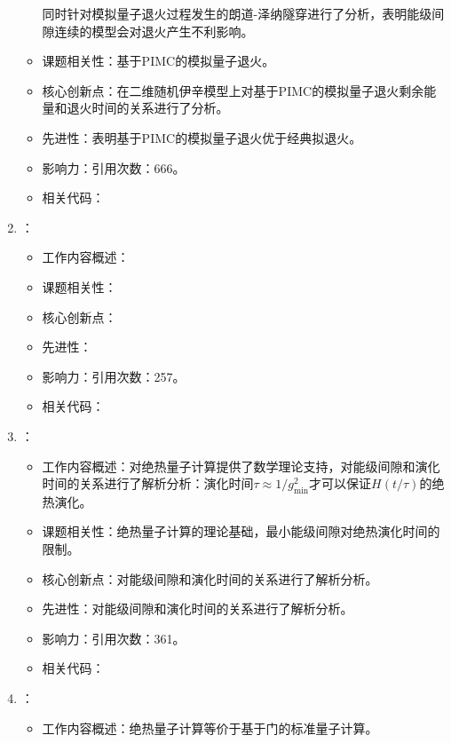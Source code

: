 \begin{enumerate}
\begin{itemize}
                同时针对模拟量子退火过程发生的朗道-泽纳隧穿进行了分析，表明能级间隙连续的模型会对退火产生不利影响。
                \item 课题相关性：基于PIMC的模拟量子退火。
                \item 核心创新点：在二维随机伊辛模型上对基于PIMC的模拟量子退火剩余能量和退火时间的关系进行了分析。
                \item 先进性：表明基于PIMC的模拟量子退火优于经典拟退火。
                \item 影响力：引用次数：666。
                \item 相关代码：
            \end{itemize}
            \item \citet{bravyi2006complexity}：
            \begin{itemize}
                \item 工作内容概述：
                \item 课题相关性：
                \item 核心创新点：
                \item 先进性：
                \item 影响力：引用次数：257。
                \item 相关代码：
            \end{itemize}
            \item \citet{jansen2007bounds}：
            \begin{itemize}
                \item 工作内容概述：对绝热量子计算提供了数学理论支持，对能级间隙和演化时间的关系进行了解析分析：演化时间$\tau\approx 1/g_{\text{min}}^2$才可以保证$H(t/\tau)$的绝热演化。
                \item 课题相关性：绝热量子计算的理论基础，最小能级间隙对绝热演化时间的限制。
                \item 核心创新点：对能级间隙和演化时间的关系进行了解析分析。
                \item 先进性：对能级间隙和演化时间的关系进行了解析分析。
                \item 影响力：引用次数：361。
                \item 相关代码：
            \end{itemize}
            \item \citet{aharonov2008adiabatic}：
            \begin{itemize}
                \item 工作内容概述：绝热量子计算等价于基于门的标准量子计算。

\end{itemize}
\end{enumerate}
